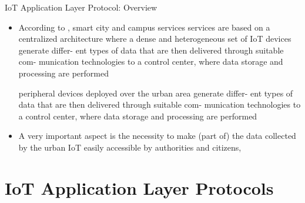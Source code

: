 \documentclass[10pt]{beamer}
\begin{document}
\begin{frame}{IoT Application Layer Protocol: Overview}

\begin{itemize}

\item According to \cite{REALSMARTIOT}, smart city and campus services services are based on a
centralized architecture where a dense and heterogeneous set of IoT devices generate differ-
ent types of data that are then delivered through suitable com-
munication technologies to a control center, where data storage
and processing are performed

peripheral devices deployed over the urban area generate differ-
ent types of data that are then delivered through suitable com-
munication technologies to a control center, where data storage
and processing are performed




\item A very important aspect is the necessity to make
(part of) the data collected by the urban IoT easily accessible
by authorities and citizens,

\end{itemize}




\end{frame} 
\section{IoT Application Layer Protocols}
\end{document}
